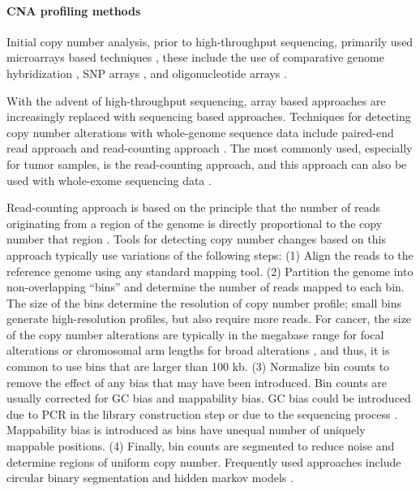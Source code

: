 \paragraph{CNA profiling methods}
Initial copy number analysis, prior to high-throughput sequencing,
primarily used microarrays based techniques \citep{carter2007methods},
these include the use of comparative genome hybridization
\citep{pinkel1998high}, SNP arrays \citep{nannya2005robust}, and
oligonucleotide arrays \citep{lucito2003representational}.

With the advent of high-throughput sequencing, array based approaches
are increasingly replaced with sequencing based approaches.  Techniques
for detecting copy number alterations with whole-genome sequence data
include paired-end read approach \citep{korbel2007paired,
campbell2008identification} and read-counting approach
\citep{yoon2009sensitive}.  The most commonly used, especially for tumor
samples, is the read-counting approach, and this approach can also be
used with whole-exome sequencing data \citep{krumm2012copy,d2016enhanced}.

Read-counting approach is based on the principle that the number of
reads originating from a region of the genome is directly proportional
to the copy number that region \citep{baslan2015optimizing}.
%
Tools for detecting copy number changes based on this approach typically
use variations of the following steps:
%
(1) Align the reads to the reference genome using any standard mapping
tool.
%
(2) Partition the genome into non-overlapping ``bins'' and determine
the number of reads mapped to each bin. The size of the bins determine
the resolution of copy number profile; small bins generate
high-resolution profiles, but also require more reads. For cancer, the
size of the copy number alterations are typically in the megabase
range for focal alterations or chromosomal arm lengths for broad
alterations \citep{beroukhim2010landscape}, and thus, it is common to
use bins that are larger than 100 kb.
%
(3) Normalize bin counts to remove the effect of any bias that may have
been introduced. Bin counts are usually corrected for GC bias and
mappability bias. GC bias could be introduced due to PCR in the library
construction step or due to the sequencing process
\citep{aird2011analyzing,benjamini2012summarizing}. Mappability bias is
introduced as bins have unequal number of uniquely mappable positions.
%
(4) Finally, bin counts are segmented to reduce noise and determine
regions of uniform copy number. Frequently used approaches include
circular binary segmentation
\citep{olshen2004circular,venkatraman2007faster} and hidden markov
models \citep{ha2014titan}.

